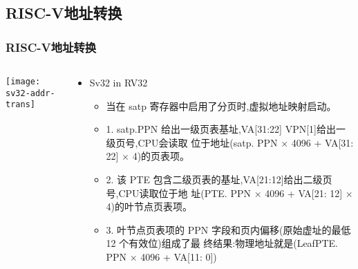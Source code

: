 \subsection{RISC-V地址转换}
\begin{frame} 
\frametitle{RISC-V地址转换}

\begin{columns}
	
	\begin{column}{.4\textwidth}
		
		\texttt{[image: sv32-addr-trans]}
		
	\end{column}
	
	
	\begin{column}{.6\textwidth}
		
		\begin{itemize}
			\item Sv32 in RV32
			\begin{itemize}
				\item 当在 satp 寄存器中启用了分页时,虚拟地址映射启动。
				 \item 1. satp.PPN 给出一级页表基址,VA[31:22] VPN[1]给出一级页号,CPU会读取
				位于地址(satp. PPN × 4096 + VA[31: 22] × 4)的页表项。 \pause
				\item 2. 该 PTE 包含二级页表的基址,VA[21:12]给出二级页号,CPU读取位于地
				址(PTE. PPN × 4096 + VA[21: 12] × 4)的叶节点页表项。  \pause
				\item 3. 叶节点页表项的 PPN 字段和页内偏移(原始虚址的最低 12 个有效位)组成了最
				终结果:物理地址就是(LeafPTE. PPN × 4096 + VA[11: 0])
				
			\end{itemize}
		\end{itemize}
		
		
		
	\end{column}
	
	
\end{columns}
\end{frame}

